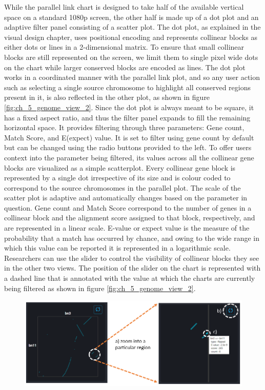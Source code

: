 While the parallel link chart is designed to take half of the available vertical space on a standard 1080p screen, the other half is made up of a dot plot and an adaptive filter panel consisting of a scatter plot. The dot plot, as explained in the visual design chapter, uses positional encoding and represents collinear blocks as either dots or lines in a 2-dimensional matrix. To ensure that small collinear blocks are still represented on the screen, we limit them to single pixel wide dots on the chart while larger conserved blocks are encoded as lines. The dot plot works in a coordinated manner with the parallel link plot, and so any user action such as selecting a single source chromosome to highlight all conserved regions present in it, is also reflected in the other plot, as shown in figure \ref{fig:ch_5_genome_view_2}. Since the dot plot is always meant to be square, it has a fixed aspect ratio, and thus the filter panel expands to fill the remaining horizontal space. It provides filtering through three parameters: Gene count, Match Score, and E(expect) value. It is set to filter using gene count by default but can be changed using the radio buttons provided to the left. To offer users context into the parameter being filtered, its values across all the collinear gene blocks are visualized as a simple scatterplot. Every collinear gene block is represented by a single dot irrespective of its size and is colour coded to correspond to the source chromosomes in the parallel plot. The scale of the scatter plot is adaptive and automatically changes based on the parameter in question. Gene count and Match Score correspond to the number of genes in a collinear block and the alignment score assigned to that block, respectively, and are represented in a linear scale. E-value or expect value is the measure of the probability that a match has occurred by chance, and owing to the wide range in which this value can be reported it is represented in a logarithmic scale. Researchers can use the slider to control the visibility of collinear blocks they see in the other two views. The position of the slider on the chart is represented with a dashed line that is annotated with the value at which the charts are currently being filtered as shown in figure \ref{fig:ch_5_genome_view_2}.


\begin{figure}[ht]
  \centering
  \includegraphics[width=.95\linewidth]{images/ch_5_chromosome_view.PNG}
  \label{fig:ch_5_chromosome_view}
\end{figure} 

